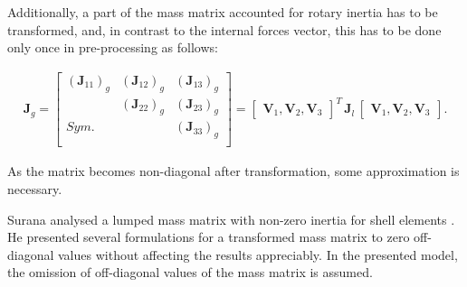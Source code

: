 Additionally, a part of the mass matrix accounted for rotary inertia has to be transformed, and, in contrast to the internal forces vector, this has to be done only once in pre-processing as follows:

\begin{eqnarray}
	\textbf{J}_g=\left [ 
	\begin{array}{ccc}
		\left (\textbf{J}_{11}\right )_g & \left (\textbf{J}_{12}\right )_g & \left (\textbf{J}_{13}\right )_g\\
		& \left (\textbf{J}_{22}\right )_g & \left (\textbf{J}_{23}\right )_g\\
		Sym. &  & \left (\textbf{J}_{33}\right )_g\\
	\end{array}
	\right ]
	=\left[\begin{array}{ccc}
		\textbf{V}_1, \textbf{V}_2, \textbf{V}_3 \end{array}\right ]^T
	\,\textbf{J}_l\,
	\left[\begin{array}{ccc}
		\textbf{V}_1, \textbf{V}_2, \textbf{V}_3 \end{array}\right ].
	\label{eq:inertia}
\end{eqnarray}

As the matrix becomes non-diagonal after transformation, some approximation is necessary.

Surana analysed a lumped mass matrix with non-zero inertia for shell elements \cite{surana1980transition}.
He presented several formulations for a transformed mass matrix to zero off-diagonal values without affecting the results appreciably.
In the presented model, the omission of off-diagonal values of the mass matrix is assumed.